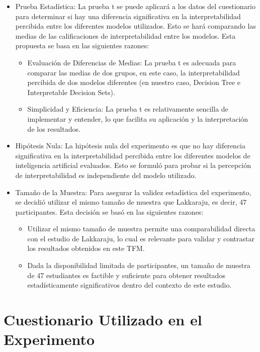 \begin{itemize}
    \item Prueba Estadística: La prueba t se puede aplicará a los datos del cuestionario para determinar si hay una diferencia significativa en la interpretabilidad percibida entre los diferentes modelos utilizados. Esto se hará comparando las medias de las calificaciones de interpretabilidad entre los modelos. Esta propuesta se basa en las siguientes razones:
    \begin{itemize}
        \item Evaluación de Diferencias de Medias: La prueba t es adecuada para comparar las medias de dos grupos, en este caso, la interpretabilidad percibida de dos modelos diferentes (en nuestro caso, Decision Tree e Interpretable Decision Sets).
        \item Simplicidad y Eficiencia: La prueba t es relativamente sencilla de implementar y entender, lo que facilita su aplicación y la interpretación de los resultados.
    \end{itemize}
    \item Hipótesis Nula: La hipótesis nula del experimento es que no hay diferencia significativa en la interpretabilidad percibida entre los diferentes modelos de inteligencia artificial evaluados. Esto se formuló para probar si la percepción de interpretabilidad es independiente del modelo utilizado.
    
    \item Tamaño de la Muestra: Para asegurar la validez estadística del experimento, se decidió utilizar el mismo tamaño de muestra que Lakkaraju, es decir, 47 participantes. Esta decisión se basó en las siguientes razones:
    \begin{itemize}
        \item Utilizar el mismo tamaño de muestra permite una comparabilidad directa con el estudio de Lakkaraju, lo cual es relevante para validar y contrastar los resultados obtenidos en este TFM.
        \item Dada la disponibilidad limitada de participantes, un tamaño de muestra de 47 estudiantes es factible y suficiente para obtener resultados estadísticamente significativos dentro del contexto de este estudio.
    \end{itemize}
\end{itemize}

\section{Cuestionario Utilizado en el Experimento}


